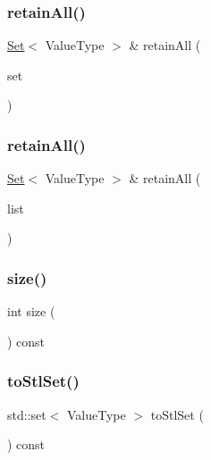 \mbox{\label{classSet_a957880d54b01f32c9419cf02fdb5bf1e}} 
\subsubsection{\texorpdfstring{retain\+All()}{retainAll()}\hspace{0.1cm}{\footnotesize\ttfamily [1/2]}}
{\footnotesize\ttfamily \mbox{\hyperlink{classSet}{Set}}$<$ Value\+Type $>$ \& retain\+All (\begin{DoxyParamCaption}\item[{const \mbox{\hyperlink{classSet}{Set}}$<$ Value\+Type $>$ \&}]{set }\end{DoxyParamCaption})}

\mbox{\label{classSet_a43e5ec97918992cb365f041c3f0b67fa}} 
\subsubsection{\texorpdfstring{retain\+All()}{retainAll()}\hspace{0.1cm}{\footnotesize\ttfamily [2/2]}}
{\footnotesize\ttfamily \mbox{\hyperlink{classSet}{Set}}$<$ Value\+Type $>$ \& retain\+All (\begin{DoxyParamCaption}\item[{std\+::initializer\+\_\+list$<$ Value\+Type $>$}]{list }\end{DoxyParamCaption})}

\mbox{\label{classSet_af9593d4a5ff4274efaf429cb4f9e57cc}} 
\subsubsection{\texorpdfstring{size()}{size()}}
{\footnotesize\ttfamily int size (\begin{DoxyParamCaption}{ }\end{DoxyParamCaption}) const}

\mbox{\label{classSet_a9306d32f2c4ffb40591b1cccf1cf2d25}} 
\subsubsection{\texorpdfstring{to\+Stl\+Set()}{toStlSet()}}
{\footnotesize\ttfamily std\+::set$<$ Value\+Type $>$ to\+Stl\+Set (\begin{DoxyParamCaption}{ }\end{DoxyParamCaption}) const}

